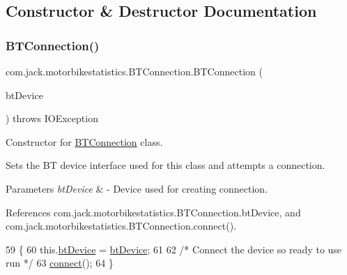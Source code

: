 \subsection{Constructor \& Destructor Documentation}
\mbox{\label{classcom_1_1jack_1_1motorbikestatistics_1_1_b_t_connection_a55a1c23b7bcf9dc097b10b62ce7828ba}} 
\subsubsection{\texorpdfstring{B\+T\+Connection()}{BTConnection()}}
{\footnotesize\ttfamily com.\+jack.\+motorbikestatistics.\+B\+T\+Connection.\+B\+T\+Connection (\begin{DoxyParamCaption}\item[{Bluetooth\+Device}]{bt\+Device }\end{DoxyParamCaption}) throws I\+O\+Exception\hspace{0.3cm}{\ttfamily [inline]}}



Constructor for \hyperlink{classcom_1_1jack_1_1motorbikestatistics_1_1_b_t_connection}{B\+T\+Connection} class. 

Sets the BT device interface used for this class and attempts a connection.


\begin{DoxyParams}{Parameters}
{\em bt\+Device} & -\/ Device used for creating connection. \\
\hline
\end{DoxyParams}


References com.\+jack.\+motorbikestatistics.\+B\+T\+Connection.\+bt\+Device, and com.\+jack.\+motorbikestatistics.\+B\+T\+Connection.\+connect().


\begin{DoxyCode}
59                                \{
60         this.\hyperlink{classcom_1_1jack_1_1motorbikestatistics_1_1_b_t_connection_af49e78cef4253d96f009a9a1473e038d}{btDevice} = \hyperlink{classcom_1_1jack_1_1motorbikestatistics_1_1_b_t_connection_af49e78cef4253d96f009a9a1473e038d}{btDevice};
61 
62         \textcolor{comment}{/* Connect the device so ready to use run */}
63         \hyperlink{classcom_1_1jack_1_1motorbikestatistics_1_1_b_t_connection_a4c1b8ebff8a40a9cddd77a55b59b45af}{connect}();
64     \}
\end{DoxyCode}


